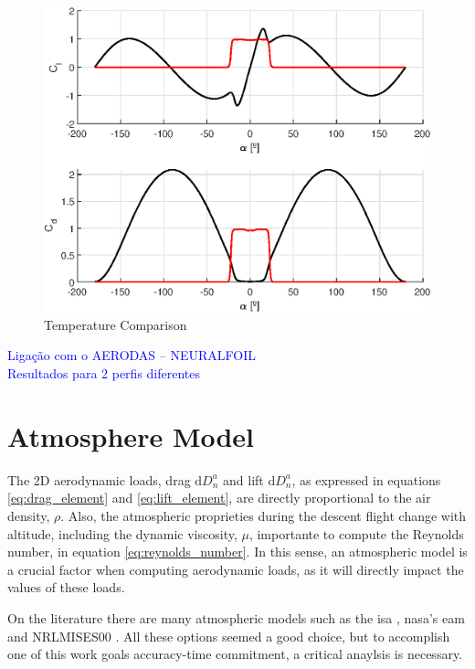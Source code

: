 \begin{figure}[!htb]
\begin{minipage}{0.3\textwidth}
		\centering
		\includegraphics[width=\textwidth]{Figures/background/aero/aero_model_1e6.eps}
		\caption{Temperature Comparison}
		\label{fig:aero_model_1e6}
	\end{minipage}
\end{figure}

\textcolor{blue}{Ligação com o AERODAS – NEURALFOIL}\\

\textcolor{blue}{Resultados para 2 perfis diferentes}\\






\section{Atmosphere Model}
\label{section:atmosphere_model}

The 2D aerodynamic loads, drag $\mathrm{d}D^a_n$ and lift $\mathrm{d}D^a_n$, as expressed in equations \ref{eq:drag_element} and \ref{eq:lift_element}, are directly proportional to the air density, $\rho$. Also, the atmospheric proprieties during the descent flight change with altitude, including the dynamic viscosity, $\mu$, importante to compute the Reynolds number, in equation \ref{eq:reynolds_number}. In this sense, an atmospheric model is a crucial factor when computing aerodynamic loads, as it will directly impact the values of these loads. 

On the literature there are many atmospheric models such as the \gls{isa} \cite{noauthor_iso_nodate}, \gls{nasa}'s \gls{eam} \cite{noauthor_earth_nodate} and NRLMISES00 \cite{picone_nrlmsise00_2002}. All these options seemed a good choice, but to accomplish one of  this work goals accuracy-time commitment, a critical anaylsis is necessary.

